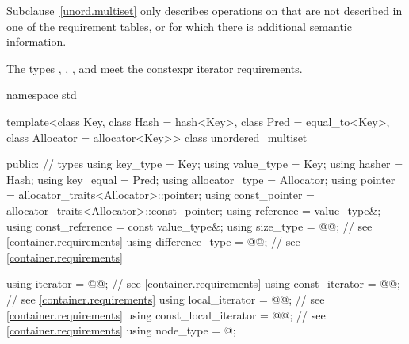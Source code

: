\pnum
Subclause~\ref{unord.multiset} only describes operations on  that
are not described in one of the requirement tables, or for which there
is additional semantic information.

\pnum
The types , ,
, and  meet
the constexpr iterator requirements.

%
\begin{codeblock}
namespace std {
  template<class Key,
           class Hash = hash<Key>,
           class Pred = equal_to<Key>,
           class Allocator = allocator<Key>>
  class unordered_multiset {
  public:
    // types
    using key_type             = Key;
    using value_type           = Key;
    using hasher               = Hash;
    using key_equal            = Pred;
    using allocator_type       = Allocator;
    using pointer              = allocator_traits<Allocator>::pointer;
    using const_pointer        = allocator_traits<Allocator>::const_pointer;
    using reference            = value_type&;
    using const_reference      = const value_type&;
    using size_type            = @@; // see \ref{container.requirements}
    using difference_type      = @@; // see \ref{container.requirements}

    using iterator             = @@; // see \ref{container.requirements}
    using const_iterator       = @@; // see \ref{container.requirements}
    using local_iterator       = @@; // see \ref{container.requirements}
    using const_local_iterator = @@; // see \ref{container.requirements}
    using node_type            = @\unspec@;

}}
\end{codeblock}
